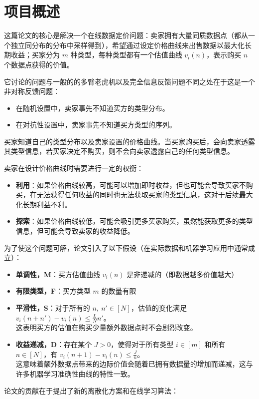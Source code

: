 \section{项目概述}

这篇论文的核心是解决一个在线数据定价问题：卖家拥有大量同质数据点（都从一个独立同分布的分布中采样得到），希望通过设定价格曲线来出售数据以最大化长期收益；买家分为 $m$ 种类型，每种类型都有一个估值曲线 $v_i(n)$，表示购买 $n$ 个数据点获得的价值。

它讨论的问题与一般的的多臂老虎机以及完全信息反馈问题不同之处在于这是一个非对称反馈问题：

\begin{itemize}
    \item 在随机设置中，卖家事先不知道买方的类型分布。
    \item 在对抗性设置中，卖家事先不知道买方类型的序列。
\end{itemize}

买家知道自己的类型分布以及卖家设置的价格曲线。当买家购买后，会向卖家透露其类型信息，若买家决定不购买，则不会向卖家透露自己的任何类型信息。

卖家在设计价格曲线时需要进行一定的权衡：

\begin{itemize}
    \item \textbf{利用}：如果价格曲线较高，可能可以增加即时收益，但也可能会导致买家不购买，在无法获得任何收益的同时也无法获取买家的类型信息，这对于后续最大化长期利益不利。
    \item \textbf{探索}：如果价格曲线较低，可能会吸引更多买家购买，虽然能获取更多的类型信息，但可能会导致卖家的收益降低。
\end{itemize}

为了使这个问题可解，论文引入了以下假设（在实际数据和机器学习应用中通常成立）：

\begin{itemize}
    \item \textbf{单调性，M}：买方估值曲线 $v_i(n)$ 是非递减的（即数据越多价值越大）
    \item \textbf{有限类型，F}：买方类型 $m$ 的数量有限
    \item \textbf{平滑性，S}：对于所有的 $n,\ n' \in [N]$，估值的变化满足 ${v_i(n+n') - v_i(n)} \leqslant \frac{L}{N}n'$。\\
        这表明买方的估值在购买少量额外数据点时不会剧烈改变。
    \item \textbf{收益递减，D}：存在某个 $J > 0$，使得对于所有类型 $i \in [m]$ 和所有 $n \in [N]$，有 $v_i(n+1) - v_i(n) \leqslant \frac{J}{n}$。\\
        这意味着额外数据点带来的边际价值会随着已拥有数据量的增加而递减，这与许多机器学习准确性曲线的特性一致。
\end{itemize}
论文的贡献在于提出了新的离散化方案和在线学习算法：

